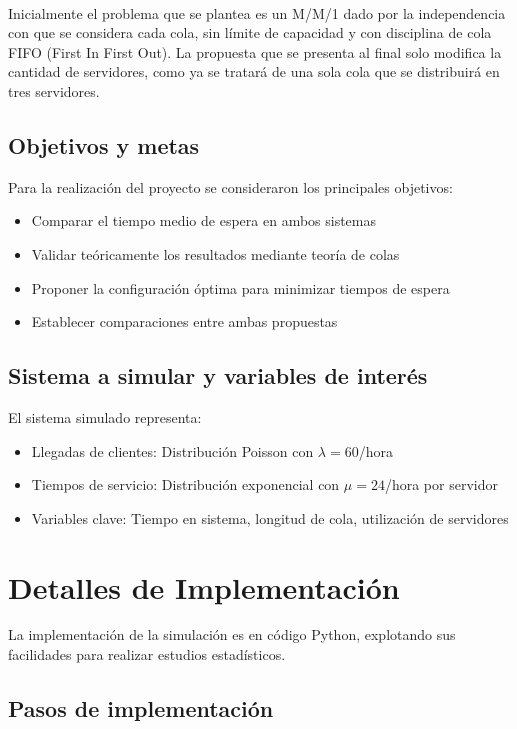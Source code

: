\documentclass{article}
\begin{document}
\

Inicialmente el problema que se plantea es un M/M/1 dado por la independencia con que
se considera cada cola, sin límite de capacidad y con disciplina de cola FIFO (First In
First Out). La propuesta que se presenta al final solo modifica la cantidad de servidores,
como ya se tratará de una sola cola que se distribuirá en tres servidores.

\subsection{Objetivos y metas}
Para la realización del proyecto se consideraron los principales objetivos:

\begin{itemize}
    \item Comparar el tiempo medio de espera en ambos sistemas
    \item Validar teóricamente los resultados mediante teoría de colas
    \item Proponer la configuración óptima para minimizar tiempos de espera
    \item Establecer comparaciones entre ambas propuestas
\end{itemize}

\subsection{Sistema a simular y variables de interés}
El sistema simulado representa:
\begin{itemize}
    \item Llegadas de clientes: Distribución Poisson con $\lambda = 60$/hora
    \item Tiempos de servicio: Distribución exponencial con $\mu = 24$/hora por servidor
    \item Variables clave: Tiempo en sistema, longitud de cola, utilización de servidores
\end{itemize}

\section{Detalles de Implementación}\label{sec:implementacion}

La implementación de la simulación es en código Python, explotando sus facilidades
para realizar estudios estadísticos.

\subsection{Pasos de implementación}
\end{document}
